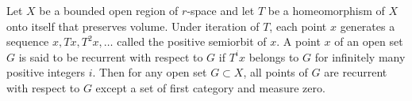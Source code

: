 Let $X$ be a bounded open region of $r$-space and let $T$ be a homeomorphism of $X$ onto itself that preserves volume. Under iteration of $T$, each point $x$ generates a sequence $x, Tx, T^2x, \ldots$ called the positive semiorbit of $x$. A point $x$ of an open set $G$ is said to be recurrent with respect to $G$ if $T^i x$ belongs to $G$ for infinitely many positive integers $i$. Then for any open set $G \subset X$, all points of $G$ are recurrent with respect to $G$ except a set of first category and measure zero.
